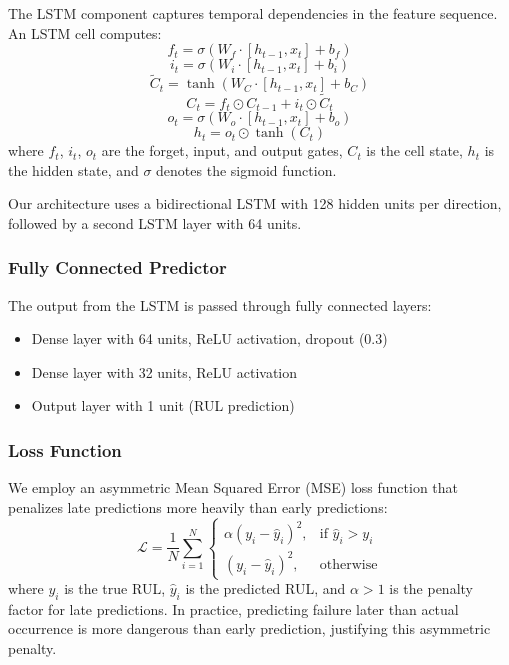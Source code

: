 \documentclass[conference,twocolumn]{IEEEtran}
\begin{document}
The LSTM component captures temporal dependencies in the feature sequence. An LSTM cell computes:
\begin{equation}
    f_t = \sigma(W_f \cdot [h_{t-1}, x_t] + b_f)
\end{equation}
\begin{equation}
    i_t = \sigma(W_i \cdot [h_{t-1}, x_t] + b_i)
\end{equation}
\begin{equation}
    \tilde{C}_t = \tanh(W_C \cdot [h_{t-1}, x_t] + b_C)
\end{equation}
\begin{equation}
    C_t = f_t \odot C_{t-1} + i_t \odot \tilde{C}_t
\end{equation}
\begin{equation}
    o_t = \sigma(W_o \cdot [h_{t-1}, x_t] + b_o)
\end{equation}
\begin{equation}
    h_t = o_t \odot \tanh(C_t)
\end{equation}
where $f_t$, $i_t$, $o_t$ are the forget, input, and output gates, $C_t$ is the cell state, $h_t$ is the hidden state, and $\sigma$ denotes the sigmoid function.

Our architecture uses a bidirectional LSTM with 128 hidden units per direction, followed by a second LSTM layer with 64 units.

\subsubsection{Fully Connected Predictor}

The output from the LSTM is passed through fully connected layers:
\begin{itemize}
    \item Dense layer with 64 units, ReLU activation, dropout (0.3)
    \item Dense layer with 32 units, ReLU activation
    \item Output layer with 1 unit (RUL prediction)
\end{itemize}

\subsubsection{Loss Function}

We employ an asymmetric Mean Squared Error (MSE) loss function that penalizes late predictions more heavily than early predictions:
\begin{equation}
    \mathcal{L} = \frac{1}{N} \sum_{i=1}^{N}
    \begin{cases}
        \alpha (y_i - \hat{y}_i)^2, & \text{if } \hat{y}_i > y_i \\
        (y_i - \hat{y}_i)^2, & \text{otherwise}
    \end{cases}
\end{equation}
where $y_i$ is the true RUL, $\hat{y}_i$ is the predicted RUL, and $\alpha > 1$ is the penalty factor for late predictions. In practice, predicting failure later than actual occurrence is more dangerous than early prediction, justifying this asymmetric penalty.
\end{document}
